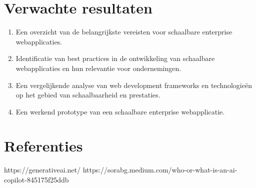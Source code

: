 \documentclass{hogent-article}
\begin{document}
\section{Verwachte resultaten}
\begin{enumerate}
  \item Een overzicht van de belangrijkste vereisten voor schaalbare enterprise webapplicaties.
  \item Identificatie van best practices in de ontwikkeling van schaalbare webapplicaties en hun relevantie voor ondernemingen.
  \item Een vergelijkende analyse van web development frameworks en technologieën op het gebied van schaalbaarheid en prestaties.
  \item Een werkend prototype van een schaalbare enterprise webapplicatie.
\end{enumerate}


\section{Referenties}
https://generativeai.net/
https://sorabg.medium.com/who-or-what-is-an-ai-copilot-845175f25ddb


\tableofcontents
\end{document}
